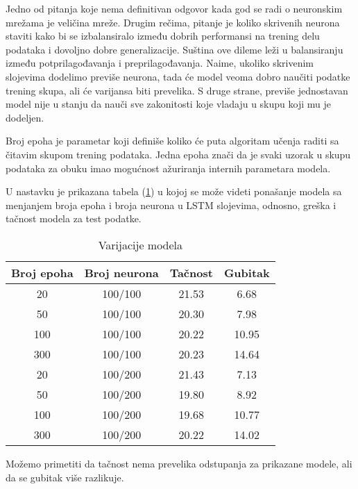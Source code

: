 \documentclass[a4paper]{article}
\begin{document}
Jedno od pitanja koje nema definitivan odgovor kada god se radi o neuronskim mrežama je veličina mreže. Drugim rečima, pitanje je koliko skrivenih neurona staviti kako bi se izbalansiralo između dobrih performansi na trening delu podataka i dovoljno dobre generalizacije. Suština ove dileme leži u balansiranju između potprilagođavanja i preprilagođavanja. Naime, ukoliko skrivenim slojevima dodelimo previše neurona, tada će model veoma dobro naučiti podatke trening skupa, ali će varijansa biti prevelika. S druge strane, previše jednostavan model nije u stanju da nauči sve zakonitosti koje vladaju u skupu koji mu je dodeljen.

Broj epoha je parametar koji definiše koliko će puta algoritam učenja raditi sa čitavim skupom trening podataka. Jedna epoha znači da je svaki uzorak u skupu podataka za obuku imao mogućnost ažuriranja internih parametara modela.

 U nastavku je prikazana tabela (\ref{tab:tabela1}) u kojoj se može videti ponašanje modela sa menjanjem broja epoha i broja neurona u LSTM slojevima, odnosno, greška i tačnost modela za test podatke.

\begin{table}[!h]
    \centering
    \begin{tabular}{|| c c c c ||}
    \hline
    \rowcolor{lightgray!60}Broj epoha & Broj neurona & Tačnost & Gubitak \\ 
    \hline\hline
    \rowcolor{yellow!40} 20 & 100/100 & 21.53 & 6.68 \\ 
    \rowcolor{yellow!60} 50 & 100/100 & 20.30 & 7.98 \\
    \rowcolor{yellow!80} 100 & 100/100 & 20.22 & 10.95 \\
    \rowcolor{yellow} 300 & 100/100 & 20.23 & 14.64 \\
    \rowcolor{orange!40} 20 & 100/200 & 21.43 & 7.13 \\
    \rowcolor{orange!60} 50 & 100/200 & 19.80 & 8.92 \\
    \rowcolor{orange!80} 100 & 100/200 & 19.68 & 10.77 \\
    \rowcolor{orange} 300 & 100/200 & 20.22 & 14.02 \\
     \hline
    \end{tabular}
    \caption{Varijacije modela}
    \label{tab:tabela1}
\end{table}


Možemo primetiti da tačnost nema prevelika odstupanja za prikazane modele, ali da se gubitak više razlikuje.
\end{document}
